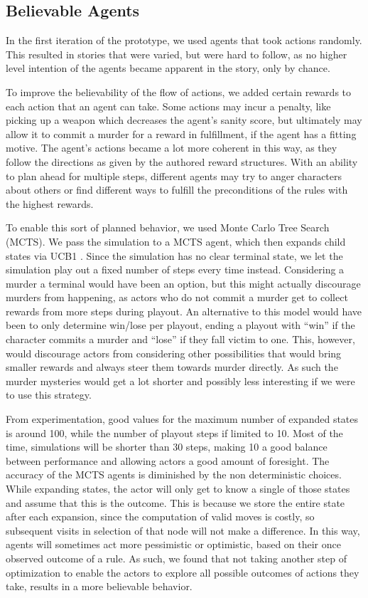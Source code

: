 \subsection{Believable Agents}
In the first iteration of the prototype, we used agents that took actions randomly. This resulted in stories that were varied, but were hard to follow, as no higher level intention of the agents became apparent in the story, only by chance.

To improve the believability of the flow of actions, we added certain rewards to each action that an agent can take. Some actions may incur a penalty, like picking up a weapon which decreases the agent's sanity score, but ultimately may allow it to commit a murder for a reward in fulfillment, if the agent has a fitting motive. The agent's actions became a lot more coherent in this way, as they follow the directions as given by the authored reward structures. With an ability to plan ahead for multiple steps, different agents may try to anger characters about others or find different ways to fulfill the preconditions of the rules with the highest rewards. 

To enable this sort of planned behavior, we used Monte Carlo Tree Search (MCTS).
We pass the simulation to a MCTS agent, which then expands child states via UCB1 .
Since the simulation has no clear terminal state, we let the simulation play out a fixed number of steps every time instead.
Considering a murder a terminal would have been an option, but this might actually discourage murders from happening, as actors who do not commit a murder get to collect rewards from more steps during playout.
An alternative to this model would have been to only determine win/lose per playout, ending a playout with \enquote{win} if the character commits a murder and \enquote{lose} if they fall victim to one.
This, however, would discourage actors from considering other possibilities that would bring smaller rewards and always steer them towards murder directly.
As such the murder mysteries would get a lot shorter and possibly less interesting if we were to use this strategy.

From experimentation, good values for the maximum number of expanded states is around 100, while the number of playout steps if limited to 10.
Most of the time, simulations will be shorter than 30 steps, making 10 a good balance between performance and allowing actors a good amount of foresight.
The accuracy of the MCTS agents is diminished by the non deterministic choices.
While expanding states, the actor will only get to know a single of those states and assume that this is the outcome.
This is because we store the entire state after each expansion, since the computation of valid moves is costly, so subsequent visits in selection of that node will not make a difference.
In this way, agents will sometimes act more pessimistic or optimistic, based on their once observed outcome of a rule.
As such, we found that not taking another step of optimization to enable the actors to explore all possible outcomes of actions they take, results in a more believable behavior.

